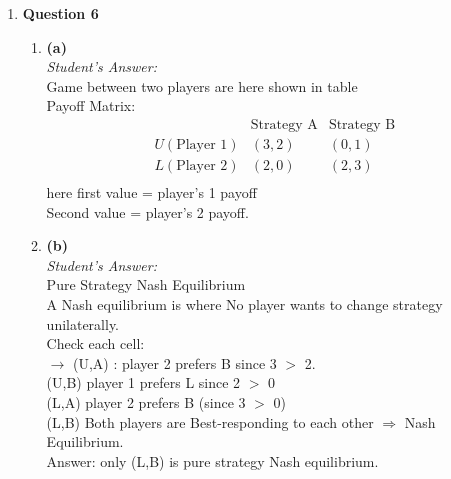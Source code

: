 \documentclass[a4paper,12pt]{article}
\begin{document}
\begin{enumerate}
    \item \textbf{Question 6}
    \begin{enumerate}
        \item \textbf{(a)} \\
        \textit{Student's Answer:} \\
        Game between two players are here shown in table \\
        Payoff Matrix: \\
        \[
        \begin{array}{c|c|c}
        & \text{Strategy A} & \text{Strategy B} \\
        \hline
        U (\text{Player 1}) & (3,2) & (0,1) \\
        L (\text{Player 2}) & (2,0) & (2,3) \\
        \end{array}
        \]
        here first value = player's 1 payoff \\
        Second value = player's 2 payoff.

        \item \textbf{(b)} \\
        \textit{Student's Answer:} \\
        Pure Strategy Nash Equilibrium \\
        A Nash equilibrium is where No player wants to change strategy unilaterally. \\
        Check each cell: \\
        $\rightarrow$ (U,A) : player 2 prefers B since 3 $>$ 2. \\
        (U,B) player 1 prefers L since 2 $>$ 0 \\
        (L,A) player 2 prefers B (since 3 $>$ 0) \\
        (L,B) Both players are Best-responding to each other $\Rightarrow$ Nash Equilibrium. \\
        Answer: only (L,B) is pure strategy Nash equilibrium.


\end{enumerate}
\end{enumerate}
\end{document}
